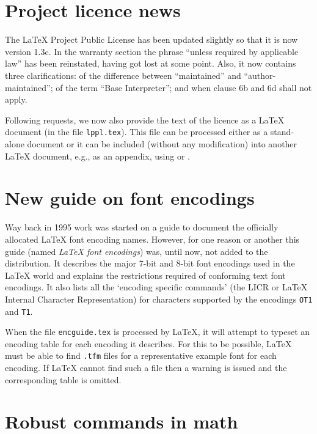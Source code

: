 \documentclass{ltnews}
\providecommand\file[1]{\texttt{#1}}
\begin{document}
\maketitle


\section{Project licence news}

The \LaTeX{} Project Public License has been updated slightly so that
it is now version 1.3c.  In the warranty section the
phrase ``unless required by applicable law'' has been reinstated,
having got lost at some point.  Also,
it now contains three clarifications: of the difference between
``maintained'' and ``author-maintained''; of the
term ``Base Interpreter''; and when clause 6b and 6d shall not apply.

Following requests, we now also provide the text of the licence as a
\LaTeX{} document (in the file \texttt{lppl.tex}). This file can be
processed either as a stand-alone document or it can be included
(without any modification) into another \LaTeX{} document, e.g., as an
appendix, using \verb|| or \verb||.


\section{New guide on font encodings}

Way  back in 1995 work was started on a guide to document the
officially allocated \LaTeX{} font encoding names. However, for one
reason or another this guide (named \textit{\LaTeX{} font encodings})
was, until now, not added to the distribution.  It describes the major
7-bit and 8-bit font encodings used in the \LaTeX{} world and explains
the restrictions required of conforming text font encodings.  It also
lists all the `encoding specific commands' (the LICR or \LaTeX{}
Internal Character Representation) for characters supported by the
encodings \texttt{OT1} and \texttt{T1}.

When the file \file{encguide.tex} is processed by \LaTeX{}, it will
attempt to typeset an encoding table for each encoding it describes.
For this to be possible, \LaTeX{} must be able to find \texttt{.tfm}
files for a representative example font for each encoding.  If
\LaTeX{} cannot find such a file then a warning is issued and the
corresponding table is omitted.


\section{Robust commands in math}
\end{document}
